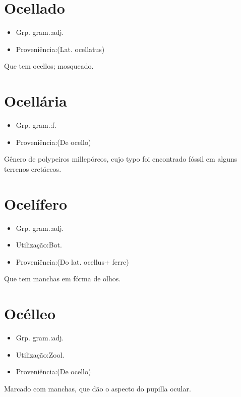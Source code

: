 \section{Ocellado}
\begin{itemize}
\item {Grp. gram.:adj.}
\end{itemize}
\begin{itemize}
\item {Proveniência:(Lat. \textunderscore ocellatus\textunderscore )}
\end{itemize}
Que tem ocellos; mosqueado.
\section{Ocellária}
\begin{itemize}
\item {Grp. gram.:f.}
\end{itemize}
\begin{itemize}
\item {Proveniência:(De \textunderscore ocello\textunderscore )}
\end{itemize}
Gênero de polypeiros millepóreos, cujo typo foi encontrado fóssil em alguns terrenos cretáceos.
\section{Ocelífero}
\begin{itemize}
\item {Grp. gram.:adj.}
\end{itemize}
\begin{itemize}
\item {Utilização:Bot.}
\end{itemize}
\begin{itemize}
\item {Proveniência:(Do lat. \textunderscore ocellus\textunderscore  + \textunderscore ferre\textunderscore )}
\end{itemize}
Que tem manchas em fórma de olhos.
\section{Océlleo}
\begin{itemize}
\item {Grp. gram.:adj.}
\end{itemize}
\begin{itemize}
\item {Utilização:Zool.}
\end{itemize}
\begin{itemize}
\item {Proveniência:(De \textunderscore ocello\textunderscore )}
\end{itemize}
Marcado com manchas, que dão o aspecto do pupilla ocular.
